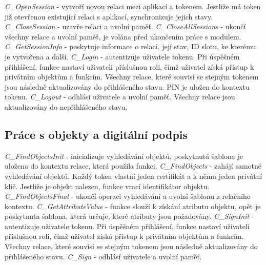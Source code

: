 \documentclass[]{fithesis3}
\begin{document}
	\textit{C\_OpenSession} - vytvoří novou relaci mezi aplikací a tokenem. Jestliže má token již 		otevřenou existující relaci s aplikací, synchronizuje jejich stavy.
	\newline
	\newline
	\textit{C\_CloseSession} - uzavře relaci a uvolní paměť.
	\newline
	\newline
	\textit{C\_CloseAllSessions} - ukončí všechny relace a uvolní paměť, je volána před ukončením 	práce s modulem.
	\newline
	\newline
	\textit{C\_GetSessionInfo} - poskytuje informace o relaci, její stav, ID slotu, ke kterému je 			vytvořena a další.
	\newline
	\newline
	\textit{C\_Login} - autentizuje uživatele tokenu. Při úspěšném přihlášení, funkce nastaví 			uživateli příslušnou roli, čímž uživatel získá přístup k privátním objektům a funkcím. Všechny 		relace, které souvisí se stejným tokenem jsou následně aktualizovány do přihlášeného stavu. 		PIN je uložen do kontextu tokenu.
	\newline
	\newline
	\textit{C\_Logout} - odhlásí uživatele a uvolní paměť. Všechny relace jsou aktualizovány do 		nepřihlášeného stavu.

	\subsection{Práce s objekty a digitální podpis}

	\textit{C\_FindObjectsInit} - inicializuje vyhledávání objektů, poskytnutá šablona je uložena do 	kontextu relace, která použila funkci.
	\newline
	\newline
	\textit{C\_FindObjects} - zahájí samotné vyhledávání objektů. Každý token vlastní jeden 			certifikát a k němu jeden privátní klíč. Jestliže je objekt nalezen, funkce vrací identifikátor 			objektu.
	\newline
	\newline
	\textit{C\_FindObjectsFinal} - ukončí operaci vyhledávání a uvolní šablonu z relačního 				kontextu.
	\newline
	\newline
	\textit{C\_GetAttributeValue} - funkce slouží k získání atributu objektu, opět je poskytnuta 			šablona, která určuje, které atributy jsou požadovány. 
	\newline
	\newline
	\textit{C\_SignInit} - autentizuje uživatele tokenu. Při úspěšném přihlášení, funkce nastaví 			uživateli příslušnou roli, čímž uživatel získá přístup k privátním objektům a funkcím. Všechny 		relace, které souvisí se stejným tokenem jsou následně aktualizovány do přihlášeného stavu.
	\newline
	\newline
	\textit{C\_Sign} - odhlásí uživatele a uvolní paměť.
\end{document}
